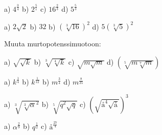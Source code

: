 \begin{tehtava}
a) $4^\frac{3}{4}$ \qquad
b) $2^\frac{5}{1}$ \qquad
c) $16^\frac{2}{3}$ \qquad
d) $5^\frac{5}{3}$ \qquad
\begin{vastaus}	
a) $2\sqrt{2}$ \qquad
b) $32$ \qquad
b) $(\sqrt[3]{16})^2$ \qquad
d) $5(\sqrt[3]{5})^2$ 
\end{vastaus}
\end{tehtava}

Muuta murtopotenssimuotoon:

\begin{tehtava}
a) $\sqrt{\sqrt{k}}$ \qquad
b) $\sqrt[3]{\sqrt[4]{k}}$ \qquad
c) $\sqrt{m\sqrt{m}}$ \qquad
d) $(\sqrt[5]{m\sqrt[7]{m}})$ \qquad
\begin{vastaus}	
a) $k^\frac{1}{4}$ \qquad
b) $k^\frac{1}{12}$ \qquad
b) $m^\frac{3}{4}$ \qquad
d) $m^\frac{8}{35}$ 
\end{vastaus}
\end{tehtava}

\begin{tehtava}
a) $\sqrt[3]{\sqrt[3]{\alpha}^2}$ \qquad
b) $\sqrt[5]{q^2\sqrt{q}}$ \qquad
c) $(\sqrt{å^4\sqrt{å}})^3$ \qquad
\begin{vastaus}	
a) $\alpha^\frac{2}{9}$ \qquad
b) $q^\frac{1}{2}$ \qquad
c) $å^\frac{27}{4}$
\end{vastaus}
\end{tehtava}